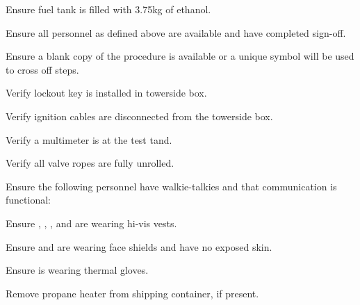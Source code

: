 \begin{checklist}
\begin{checklist}
        \item Ensure fuel tank is filled with 3.75kg of ethanol. 
        \item Ensure all personnel as defined above are available and have completed sign-off.
         \item Ensure a blank copy of the procedure is available or a unique symbol will be used to cross off steps. 
         \item Verify lockout key is installed in towerside box. 
         \item Verify ignition cables are disconnected from the towerside box.
         \item Verify a multimeter is at the test tand.
        \item Verify all valve ropes are fully unrolled. 
        \item Ensure the following personnel have walkie-talkies and that communication is functional:
        \begin{checklist}
            \item \ops{}
            \item \secondary{}
            \item \peri{}
            \item \perii{}
            \item \periii{}
            \item \periv{}
        \end{checklist}
        \item Ensure \peri{}, \perii{}, \periii{}, and \periv{} are wearing hi-vis vests.
        \item Ensure \primary{} and \secondary{} are wearing face shields and have no exposed skin.
        \item Ensure \primary{} is wearing thermal gloves.
        \item Remove propane heater from shipping container, if present.
    \end{checklist}
      
\end{checklist}
\setcounter{checklistnum}{0}


